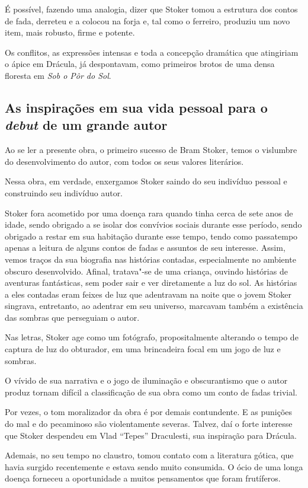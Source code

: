 \documentclass[12pt]{extarticle}
\begin{document}
É possível, fazendo uma analogia, dizer que Stoker tomou a estrutura dos
contos de fada, derreteu e a colocou na forja e, tal como o ferreiro,
produziu um novo item, mais robusto, firme e potente.

Os conflitos, as expressões intensas e toda a concepção dramática que
atingiriam o ápice em Drácula, já despontavam, como primeiros brotos de
uma densa floresta em \emph{Sob o Pôr do Sol}.

\subsection{As inspirações em sua vida pessoal para o \textit{debut} de um grande autor}

Ao se ler a presente obra, o primeiro sucesso de Bram Stoker, temos o
vislumbre do desenvolvimento do autor, com todos os seus valores
literários.

Nessa obra, em verdade, enxergamos Stoker saindo do seu indivíduo
pessoal e construindo seu indivíduo autor.

Stoker fora acometido por uma doença rara quando tinha cerca de sete
anos de idade, sendo obrigado a se isolar dos convívios sociais durante
esse período, sendo obrigado a restar em sua habitação durante esse
tempo, tendo como passatempo apenas a leitura de alguns contos de fadas
e assuntos de seu interesse. Assim, vemos traços da sua biografia nas
histórias contadas, especialmente no ambiente obscuro desenvolvido.
Afinal, tratava"-se de uma criança, ouvindo histórias de aventuras
fantásticas, sem poder sair e ver diretamente a luz do sol. As histórias
a eles contadas eram feixes de luz que adentravam na noite que o jovem
Stoker singrava, entretanto, ao adentrar em seu universo, marcavam
também a existência das sombras que perseguiam o autor.

Nas letras, Stoker age como um fotógrafo, propositalmente alterando o
tempo de captura de luz do obturador, em uma brincadeira focal em um
jogo de luz e sombras.

O vívido de sua narrativa e o jogo de iluminação e obscurantismo que o
autor produz tornam difícil a classificação de sua obra como um conto de
fadas trivial.

Por vezes, o tom moralizador da obra é por demais contundente. E as
punições do mal e do pecaminoso são violentamente severas. Talvez, daí o
forte interesse que Stoker despendeu em Vlad ``Tepes'' Draculesti, sua
inspiração para Drácula.

Ademais, no seu tempo no claustro, tomou contato com a literatura
gótica, que havia surgido recentemente e estava sendo muito consumida. O
ócio de uma longa doença forneceu a oportunidade a muitos pensamentos
que foram frutíferos.
\end{document}
